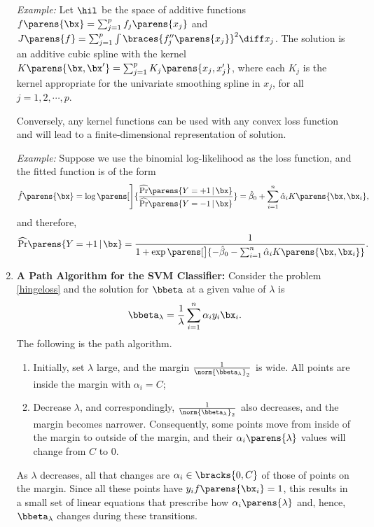 \documentclass[12pt]{article}
\begin{document}
\begin{enumerate}[label=\textbf{\arabic*.}]
	\textit{Example:} Let $\hil$ be the space of additive functions $f \parens{\bx} = \sum_{j=1}^p f_j \parens{x_j}$ and $J \parens{f} = \sum_{j=1}^p \int \braces{f''_j \parens{x_j}}^2 \diff x_j$. The solution is an additive cubic spline with the kernel $K \parens{\bx, \bx'} = \sum_{j=1}^p K_j \parens{x_j, x_j'}$, where each $K_j$ is the kernel appropriate for the univariate smoothing spline in $x_j$, for all $j = 1, 2, \cdots, p$. 
	
	Conversely, any kernel functions can be used with any convex loss function and will lead to a finite-dimensional representation of solution. 
	
	\textit{Example:} Suppose we use the binomial log-likelihood as the loss function, and the fitted function is of the form 
	\begin{align*}
		\hat{f} \parens{\bx} = \log \parens[\Bigg]{\frac{\widehat{\Pr} \parens{Y = +1 \,\vert\, \bx}}{\widehat{\Pr} \parens{Y = -1 \,\vert\, \bx}}} = \hat{\beta}_0 + \sum_{i=1}^n \hat{\alpha}_i K \parens{\bx, \bx_i}, 
	\end{align*}
	and therefore, 
	\begin{equation*}
		\widehat{\Pr} \parens{Y = +1 \,\vert\, \bx} = \frac{1}{1 + \exp \parens[\big]{ - \hat{\beta}_0 - \sum_{i=1}^n \hat{\alpha}_i K \parens{\bx, \bx_i}}}. 
	\end{equation*}
		
	\item \textbf{A Path Algorithm for the SVM Classifier:} Consider the problem \eqref{hingeloss} and the solution for $\bbeta$ at a given value of $\lambda$ is 
	\begin{align*}
		\bbeta_{\lambda} = \frac{1}{\lambda} \sum_{i=1}^n \alpha_i y_i \bx_i. 
	\end{align*}
	The following is the path algorithm. 
	\begin{enumerate}
		\item Initially, set $\lambda$ large, and the margin $\frac{1}{\norm{\bbeta_{\lambda}}_2}$ is wide. All points are inside the margin with $\alpha_i = C$; 
		\item Decrease $\lambda$, and correspondingly, $\frac{1}{\norm{\bbeta_{\lambda}}_2}$ also decreases, and the margin becomes narrower. Consequently, some points move from inside of the margin to outside of the margin, and their $\alpha_i \parens{\lambda}$ values will change from $C$ to 0. 
	\end{enumerate}
	
	As $\lambda$ decreases, all that changes are $\alpha_i \in \bracks{0, C}$ of those of points on the margin. Since all these points have $y_i f \parens{\bx_i} = 1$, this results in a small set of linear equations that prescribe how $\alpha_i \parens{\lambda}$ and, hence, $\bbeta_{\lambda}$ changes during these transitions. 

\end{enumerate}
\end{document}
